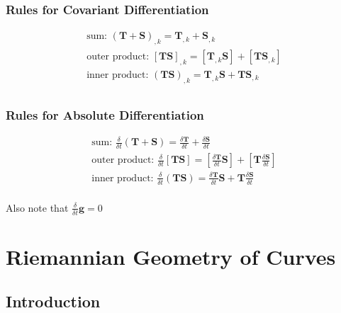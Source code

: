 \documentclass{article}
\begin{document}
\subsubsection{Rules for Covariant Differentiation}

\begin{align*}
	\text{sum: } (\mathbf{ T } + \mathbf{ S })_{,k} = \mathbf{ T }_{,k} + \mathbf{ S }_{,k}\\
	\text{outer product: } [\mathbf{ T } \mathbf{ S }]_{,k} = [\mathbf{ T }_{,k} \mathbf{ S }] + [\mathbf{ T } \mathbf{ S }_{,k}]\\
	\text{inner product: } (\mathbf{ T } \mathbf{ S })_{,k} = \mathbf{ T }_{,k} \mathbf{ S } + \mathbf{ T } \mathbf{ S }_{,k}\\
\end{align*}

\subsubsection{Rules for Absolute Differentiation}

\begin{align*}
	\text{sum: } \frac{ \delta }{ \delta t } (\mathbf{ T } + \mathbf{ S }) = \frac{ \delta \mathbf{ T } }{ \delta t } + \frac{ \delta \mathbf{ S } }{ \delta t }\\
	\text{outer product: } \frac{ \delta }{ \delta t } [\mathbf{ T } \mathbf{ S }] = [\frac{ \delta \mathbf{ T } }{ \delta t } \mathbf{ S }] + [\mathbf{ T } \frac{ \delta \mathbf{ S } }{ \delta t }]\\
	\text{inner product: } \frac{ \delta }{ \delta t } (\mathbf{ T } \mathbf{ S }) = \frac{ \delta \mathbf{ T } }{ \delta t } \mathbf{ S } + \mathbf{ T } \frac{ \delta \mathbf{ S } }{ \delta t }\\
\end{align*}

Also note that $\frac{ \delta }{ \delta t } \mathbf{ g } = 0$










%
%
\newpage
\section{Riemannian Geometry of Curves}

\subsection{Introduction}
\end{document}
